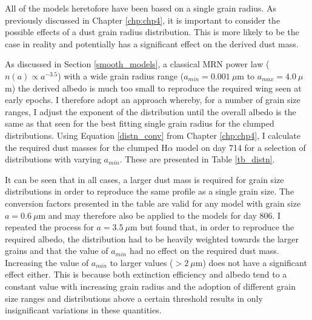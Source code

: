 All of the models heretofore have been based on a single grain radius.  As previously discussed in Chapter \ref{chp:chp4}, it is important to consider the possible effects of a dust grain radius distribution.  This is more likely to be the case in reality and potentially has a significant effect on the derived dust mass.  

 As discussed in Section \ref{smooth_models}, a classical MRN power law ($n(a) \propto a^{-3.5}$) with a wide grain radius range ($a_{min} = 0.001~\mu$m to $a_{max} = 4.0~\mu$m) the derived albedo is much too small to reproduce the required wing seen at early epochs.  I therefore adopt an approach whereby, for a number of grain size ranges, I adjust the exponent of the distribution until the overall albedo is the same as that seen for the best fitting single grain radius for the clumped distributions. Using Equation \ref{distn_conv} from Chapter \ref{chp:chp4}, I calculate the required dust masses for the clumped H$\alpha$ model on day 714 for a selection of distributions with varying $a_{min}$.  These are presented in Table \ref{tb_distn}.  
 
 It can be seen that in all cases, a larger dust mass is required for grain size distributions in order to reproduce the same profile as a single grain size.  The conversion factors presented in the table are valid for any model with grain size $a=0.6~\mu$m and may therefore also be applied to the models for day 806.  I repeated the process for $a=3.5~\mu$m but found that, in order to reproduce the required albedo, the distribution had to be heavily weighted towards the larger grains and that the value of $a_{min}$ had no effect on the required dust mass.  Increasing the value of $a_{min}$ to larger values ($>2~\mu$m) does not have a significant effect either.  This is because both extinction efficiency and albedo tend to a constant value with increasing grain radius and the adoption of different grain size ranges and distributions above a certain threshold results in only insignificant variations in these quantities.
 
